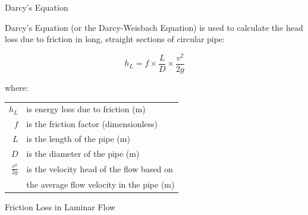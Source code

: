 \documentclass[9pt,xcolor={svgnames, x11names},professionalfonts, mathserif]{beamer}
\begin{document}
\begin{frame}{Darcy's Equation}
	\begin{cmini}[0.8]{
			Darcy's Equation (or the Darcy-Weisbach Equation) is used to calculate the head loss due to friction in long, straight
			sections of circular pipe:
		}
	\end{cmini}
	\vspace{-0.75cm}
	\begin{cmini}[0.5]{
			\par\medskip
			\begin{mybox}[title = Darcy's Equation]
				\[  h_L=f\times \frac{L}{D}\times \frac{v^2}{2g} \]
			\end{mybox}
			\parm
			where:
			\parm
			\begin{tabular}{rl}
				$h_L$             & is energy loss due to friction (m)        \\
				\addlinespace
				$f$               & is the friction factor (dimensionless)    \\
				\addlinespace
				$L$               & is the length of the pipe (m)             \\
				\addlinespace
				$D$               & is the diameter of the pipe (m)           \\
				\addlinespace
				$\tfrac{v^2}{2g}$ & is the velocity head of the flow based on \\&
				the average flow velocity in the pipe (m)\\
			\end{tabular}
		}
	\end{cmini}
	
\end{frame}

\begin{frame}{Friction Loss in Laminar Flow}
\end{frame}
\end{document}
